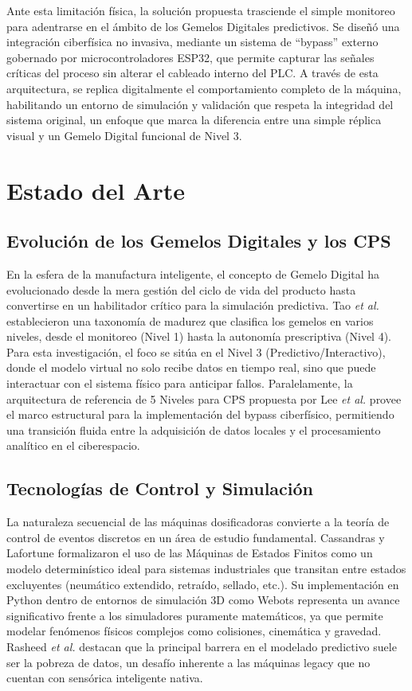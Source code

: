 Ante esta limitación física, la solución propuesta trasciende el simple monitoreo para adentrarse en el ámbito de los Gemelos Digitales predictivos. Se diseñó una integración ciberfísica no invasiva, mediante un sistema de ``bypass'' externo gobernado por microcontroladores ESP32, que permite capturar las señales críticas del proceso sin alterar el cableado interno del PLC. A través de esta arquitectura, se replica digitalmente el comportamiento completo de la máquina, habilitando un entorno de simulación y validación que respeta la integridad del sistema original, un enfoque que marca la diferencia entre una simple réplica visual y un Gemelo Digital funcional de Nivel 3.

\section{Estado del Arte}

\subsection*{Evolución de los Gemelos Digitales y los CPS}
En la esfera de la manufactura inteligente, el concepto de Gemelo Digital ha evolucionado desde la mera gestión del ciclo de vida del producto hasta convertirse en un habilitador crítico para la simulación predictiva. Tao \textit{et al.} \cite{tao2019} establecieron una taxonomía de madurez que clasifica los gemelos en varios niveles, desde el monitoreo (Nivel 1) hasta la autonomía prescriptiva (Nivel 4). Para esta investigación, el foco se sitúa en el Nivel 3 (Predictivo/Interactivo), donde el modelo virtual no solo recibe datos en tiempo real, sino que puede interactuar con el sistema físico para anticipar fallos. Paralelamente, la arquitectura de referencia de 5 Niveles para CPS propuesta por Lee \textit{et al.} \cite{lee2015} provee el marco estructural para la implementación del bypass ciberfísico, permitiendo una transición fluida entre la adquisición de datos locales y el procesamiento analítico en el ciberespacio.

\subsection*{Tecnologías de Control y Simulación}
La naturaleza secuencial de las máquinas dosificadoras convierte a la teoría de control de eventos discretos en un área de estudio fundamental. Cassandras y Lafortune \cite{cassandras2021} formalizaron el uso de las Máquinas de Estados Finitos como un modelo determinístico ideal para sistemas industriales que transitan entre estados excluyentes (neumático extendido, retraído, sellado, etc.). Su implementación en Python dentro de entornos de simulación 3D como Webots \cite{michel2004} representa un avance significativo frente a los simuladores puramente matemáticos, ya que permite modelar fenómenos físicos complejos como colisiones, cinemática y gravedad. Rasheed \textit{et al.} \cite{rasheed2020} destacan que la principal barrera en el modelado predictivo suele ser la pobreza de datos, un desafío inherente a las máquinas legacy que no cuentan con sensórica inteligente nativa.

